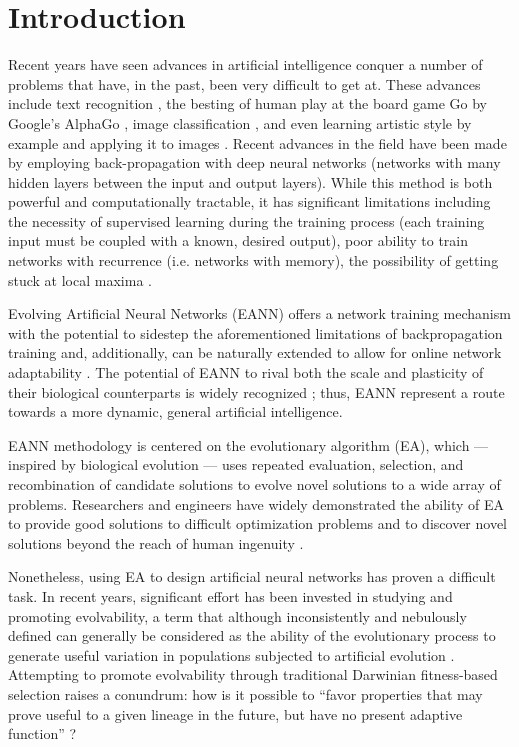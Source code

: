 \section{Introduction}
Recent years have seen advances in artificial intelligence conquer a number of problems that have, in the past, been very difficult to get at. These advances include text recognition \cite{GuRecentNetworks}, the besting of human play at the board game Go by Google's AlphaGo \cite{Silver2016MasteringSearch}, image classification \cite{GuRecentNetworks}, and even learning artistic style by example and applying it to images \cite{Gatys2015AStyle}. Recent advances in the field have been made by employing back-propagation with deep neural networks (networks with many hidden layers between the input and output layers). While this method is both powerful and computationally tractable, it has significant limitations including the necessity of supervised learning during the training process (each training input must be coupled with a known, desired output), poor ability to train networks with recurrence (i.e. networks with memory), the possibility of getting stuck at local maxima \cite[pg 312, 364]{Downing2015IntelligenceSystems}. 

Evolving Artificial Neural Networks (EANN) offers a network training mechanism with the potential to sidestep the aforementioned limitations of backpropagation training and, additionally, can be naturally extended to allow for online network adaptability \cite{Tonelli2013OnNetworks}. The potential of EANN to rival both the scale and plasticity of their biological counterparts is widely recognized \cite{Tonelli2013OnNetworks}; thus, EANN represent a route towards a more dynamic, general artificial intelligence. 

EANN methodology is centered on the evolutionary algorithm (EA), which --- inspired by biological evolution --- uses repeated evaluation, selection, and recombination of candidate solutions to evolve novel solutions to a wide array of problems. Researchers and engineers have widely demonstrated the ability of EA to provide good solutions to difficult optimization problems and to discover novel solutions beyond the reach of human ingenuity \cite{Poli2008AProgramming}.

Nonetheless, using EA to design artificial neural networks has proven a difficult task. In recent years, significant effort has been invested in studying and promoting evolvability, a term that although inconsistently and nebulously defined can generally be considered as the ability of the evolutionary process to generate useful variation in populations subjected to artificial evolution \cite{Richter2015EvolvabilitySurvey,Reisinger2005TowardsEvolvability, Wilder2015ReconcilingEvolvability}. Attempting to promote evolvability through traditional Darwinian fitness-based selection raises a conundrum: how is it possible to ``favor properties that may prove useful to a given lineage in the future, but have no present adaptive function'' \cite{Pigliucci2008IsEvolvable}? 

